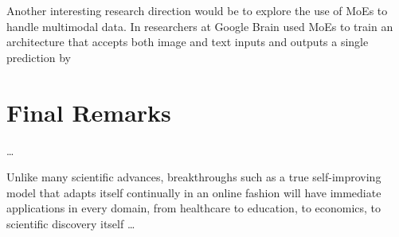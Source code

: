 \documentclass[../main.tex]{subfiles}
\begin{document}
    Another interesting research direction would be to explore the use of MoEs to handle multimodal data. In \cite{mustafa_multimodal_2022} researchers at Google Brain used MoEs to train an architecture that accepts both image and text inputs and outputs a single prediction by 
    


    



    \section{Final Remarks} \label{conclusions:final_remarks} 
    
    \dots

    Unlike many scientific advances, breakthroughs such as a true self-improving model that adapts itself continually in an online fashion will have immediate applications in every domain, from healthcare to education, to economics, to scientific discovery itself \dots 

\end{document}
